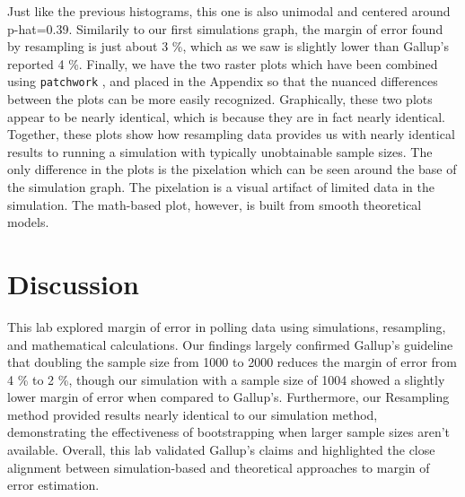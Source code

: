 \documentclass{article}\usepackage[]{graphicx}\usepackage[]{xcolor}
\begin{document}
\begin{multicols}{2}
\indent 
Just like the previous histograms, this one is also unimodal and centered around p-hat=0.39. Similarily to our first simulations graph, the margin of error found by resampling is just about 3 \%, which as we saw is slightly lower than Gallup's reported 4 \%.
\newline
\indent
Finally, we have the two raster plots which have been combined using \texttt{patchwork} \citep{patchwork}, and placed in the Appendix so that the nuanced differences between the plots can be more easily recognized. Graphically, these two plots appear to be nearly identical, which is because they are in fact nearly identical. Together, these plots show how resampling data provides us with nearly identical results to running a simulation with typically unobtainable sample sizes. The only difference in the plots is the pixelation which can be seen around the base of the simulation graph. The pixelation is a visual artifact of limited data in the simulation. The math-based plot, however, is built from smooth theoretical models. 


\section{Discussion}
This lab explored margin of error in polling data using simulations, resampling, and mathematical calculations. Our findings largely confirmed Gallup's guideline that doubling the sample size from 1000 to 2000 reduces the margin of error from 4 \% to 2 \%, though our simulation with a sample size of 1004 showed a slightly lower margin of error when compared to Gallup's. Furthermore, our Resampling method provided results nearly identical to our simulation method, demonstrating the effectiveness of bootstrapping when larger sample sizes aren't available. Overall, this lab validated Gallup's claims and highlighted the close alignment between simulation-based and theoretical approaches to margin of error estimation.





\vspace{2em}


\nocite{patchwork}
\nocite{tidyverse}

\begin{tiny}

\end{tiny}
\end{multicols}
\end{document}
